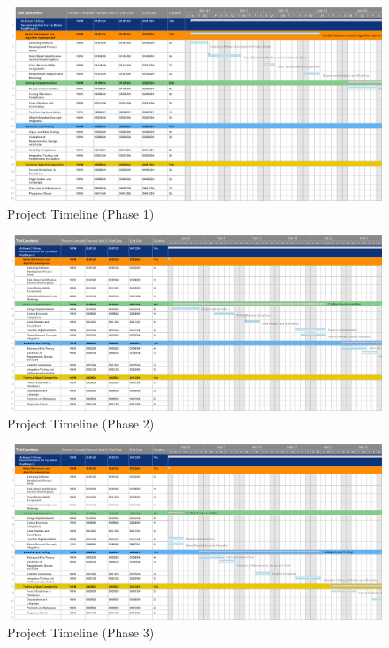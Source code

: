     \begin{figure}
        \centering
        \includegraphics[width=1\textwidth]{components/images/timeline1.png}
        \caption{Project Timeline (Phase 1)}
        \label{fig:recomm}
    \end{figure}
    \begin{figure}
        \centering
        \includegraphics[width=1\textwidth]{components/images/timeline2.png}
        \caption{Project Timeline (Phase 2)}
        \label{fig:recomm}
    \end{figure}
    \begin{figure}
        \centering
        \includegraphics[width=1\textwidth]{components/images/timeline3.png}
        \caption{Project Timeline (Phase 3)}
        \label{fig:recomm}
    \end{figure}
